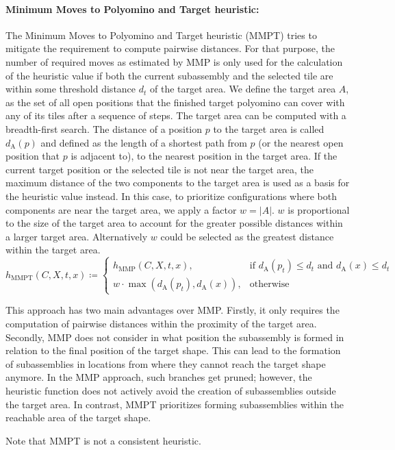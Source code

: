\paragraph{Minimum Moves to Polyomino and Target heuristic:}
The Minimum Moves to Polyomino and Target heuristic (MMPT) tries to mitigate the requirement to compute pairwise distances. For that purpose, the number of required moves as estimated by MMP is only used for the calculation of the heuristic value if both the current subassembly and the selected tile are within some threshold distance $d_t$ of the target area. We define the target area $A$, as the set of all open positions that the finished target polyomino can cover with any of its tiles after a sequence of steps. The target area can be computed with a breadth-first search. The distance of a position $p$ to the target area is called $d_{\text{A}}(p)$ and defined as the length of a shortest path from $p$ (or the nearest open position that $p$ is adjacent to), to the nearest position in the target area.
If the current target position or the selected tile is not near the target area, the maximum distance of the two components to the target area is used as a basis for the heuristic value instead. In this case, to prioritize configurations where both components are near the target area, we apply a factor $w = |A|$. $w$ is proportional to the size of the target area to account for the greater possible distances within a larger target area.
Alternatively $w$ could be selected as the greatest distance within the target area.
\begin{equation}
h_{\text{MMPT}}(C, X, t, x) \coloneqq
\begin{cases}
h_{\text{MMP}}(C, X, t, x), & \text{if } d_{\text{A}}(p_t) \leq d_t \text{ and } d_{\text{A}}(x) \leq d_t\\
w \cdot \max(d_{\text{A}}(p_t), d_{\text{A}}(x)), & \text{otherwise}
\end{cases}
\end{equation}

This approach has two main advantages over MMP. Firstly, it only requires the computation of pairwise distances within the proximity of the target area. Secondly, MMP does not consider in what position the subassembly is formed in relation to the final position of the target shape. This can lead to the formation of subassemblies in locations from where they cannot reach the target shape anymore. In the MMP approach, such branches get pruned; however, the heuristic function does not actively avoid the creation of subassemblies outside the target area. In contrast, MMPT prioritizes forming subassemblies within the reachable area of the target shape.\par
Note that MMPT is not a consistent heuristic.


